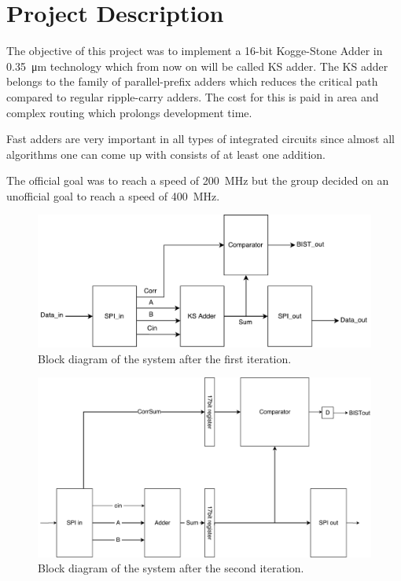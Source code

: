 \section{Project Description} \label{sec:project_description}
The objective of this project was to implement a 16-bit Kogge-Stone Adder in \SI{0.35}{\micro\m} technology which from now on will be called KS adder. The KS adder belongs to the family of parallel-prefix adders which reduces the critical path compared to regular ripple-carry adders. The cost for this is paid in area and complex routing which prolongs development time.

Fast adders are very important in all types of integrated circuits since almost all algorithms one can come up with consists of at least one addition. 

The official goal was to reach a speed of \SI{200}{\mega\Hz} but the group decided on an unofficial goal to reach a speed of \SI{400}{\mega\Hz}.

\begin{figure}[H]
  \centering
  \captionsetup{justification=centering}
  \includegraphics[scale=0.5]{../figures/TOP.pdf}
  \caption{Block diagram of the system after the first iteration.} \label{fig:block_first}
\end{figure}

\begin{figure}[H]
\centering
\captionsetup{justification=centering}
\includegraphics[scale=0.1]{../figures/top_level_second.png}
\caption{Block diagram of the system after the second iteration.} \label{fig:block_second}
\end{figure}

